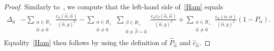 \documentclass[12pt]{amsart}
\numberwithin{equation}{section}
\theoremstyle{definition}
\begin{document}
\begin{proof}
Similarly to~\cite[Proposition 2]{Feigin}, we compute that the left-hand side of~\eqref{Ham} equals
\begin{align*}
    \Delta_y &- \sum\limits_{\substack{\alpha \in R_+ \\ \widehat{\alpha} \neq 0}} \frac{c_{\alpha}(\widehat{\alpha},\widehat{\alpha})}{(\widehat{\alpha},y)^2} - \sum\limits_{\substack{\alpha \in R_+ \\ \widehat{\alpha} \neq 0}} \sum\limits_{\substack{\beta \in R_+ \\ 0 \neq \widehat{\beta} \sim \widehat{\alpha}}} \frac{c_{\alpha} c_{\beta}(\widehat{\alpha},\widehat{\alpha})}{(\widehat{\alpha},y)^2}  
    + \sum\limits_{\substack{\alpha \in R_+ \\ \widehat{\alpha} \neq 0}}  \frac{c_{\alpha} (\alpha, \alpha)}{(\widehat{\alpha},y)^2} (1 - P_{\alpha}).
\end{align*} 
Equality~\eqref{Ham} then follows by using
the definition of
$\widehat{P}_{\widehat{\alpha}}$ and $\widehat{c}_{\widehat{\alpha}}$.
\end{proof}
\end{document}
